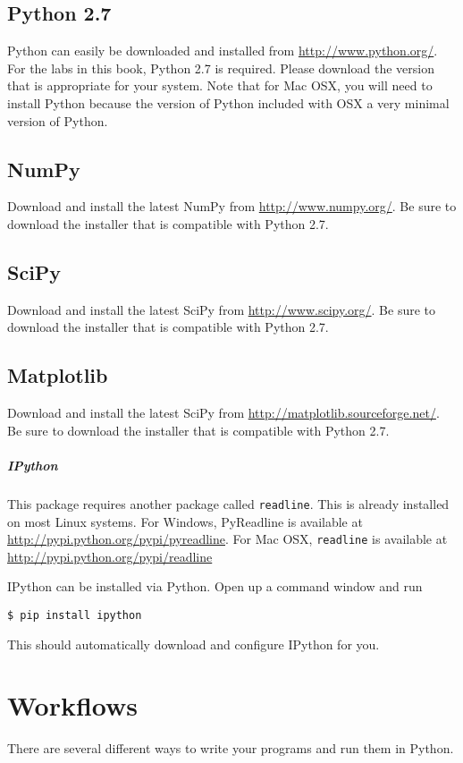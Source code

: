\subsection*{Python 2.7}
Python can easily be downloaded and installed from \url{http://www.python.org/}.  
For the labs in this book, Python 2.7 is required.
Please download the version that is appropriate for your system.  
Note that for Mac OSX, you will need to install Python because the version of Python included with OSX a very minimal version of Python.

\subsection*{NumPy}
Download and install the latest NumPy from \url{http://www.numpy.org/}.  
Be sure to download the installer that is compatible with Python 2.7.

\subsection*{SciPy}
Download and install the latest SciPy from \url{http://www.scipy.org/}. 
Be sure to download the installer that is compatible with Python 2.7.

\subsection*{Matplotlib}
Download and install the latest SciPy from \url{http://matplotlib.sourceforge.net/}.
Be sure to download the installer that is compatible with Python 2.7.

\subparagraph*{IPython}
This package requires another package called \texttt{readline}.
This is already installed on most Linux systems. 
For Windows, PyReadline is available at \url{http://pypi.python.org/pypi/pyreadline}.
For Mac OSX, \texttt{readline} is available at \url{http://pypi.python.org/pypi/readline}

IPython can be installed via Python.
Open up a command window and run
\begin{lstlisting}
$ pip install ipython
\end{lstlisting}
This should automatically download and configure IPython for you.

\section*{Workflows}
There are several different ways to write your programs and run them in Python.

